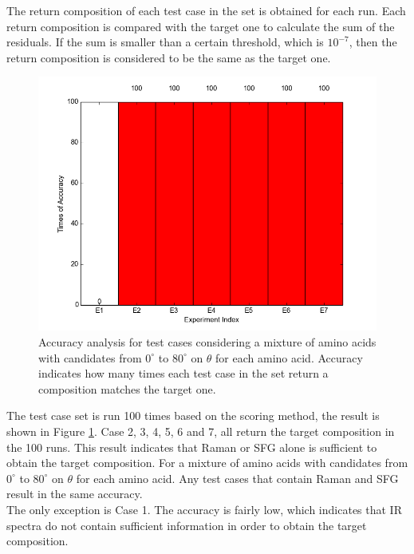 The return composition of each test case in the set is obtained for each run. Each return composition is compared with the target one to calculate the sum of the residuals. If the sum is smaller than a certain threshold, which is $10^{-7}$, then the return composition is considered to be the same as the target one. \\

\begin{figure}[!ht]
\centering
\includegraphics[scale=0.7]{Figures/accuracy_pecent_result8_mixture.png}
\caption{Accuracy analysis for test cases considering a mixture of amino acids with candidates from $0^{\circ}$ to $80^{\circ}$ on $\theta$ for each amino acid. Accuracy indicates how many times each test case in the set return a composition matches the target one.}  \label{fig:5.1}
\end{figure}

The test case set is run 100 times based on the scoring method, the result is shown in 
Figure \ref{fig:5.1}. Case 2, 3, 4, 5, 6 and 7, all return the target composition in the 100 runs. This result indicates that Raman or SFG alone is sufficient to obtain the target composition. For a mixture of amino acids with candidates from $0^{\circ}$ to $80^{\circ}$ on $\theta$ for each amino acid. Any test cases that contain Raman and SFG result in the same accuracy. \\

The only exception is Case 1. The accuracy is fairly low, which indicates that IR spectra do not contain sufficient information in order to obtain the target composition. \\

